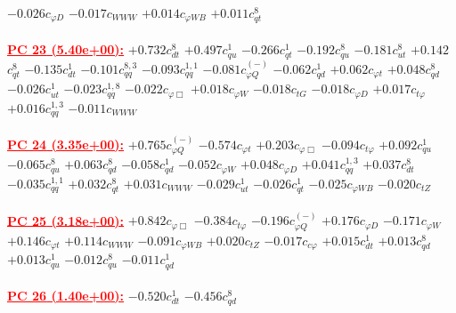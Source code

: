 \documentclass{article}
\begin{document}
{$-0.026$}{\rm $c_{\varphi D}$} 
{$-0.017$}{\rm $c_{WWW}$} 
{$+0.014$}{\rm $c_{\varphi WB}$} 
{$+0.011$}{\rm $c_{qt}^{8}$} 
 \nonumber \\ \nonumber \\ 
\noindent \textcolor{red}{\underline{\bf{PC 23} (5.40e+00):}}
{$+0.732$}{\rm $c_{dt}^{8}$} 
{$+0.497$}{\rm $c_{qu}^{1}$} 
{$-0.266$}{\rm $c_{qt}^{1}$} 
{$-0.192$}{\rm $c_{qu}^{8}$} 
{$-0.181$}{\rm $c_{ut}^{8}$} 
{$+0.142$}{\rm $c_{qt}^{8}$} 
{$-0.135$}{\rm $c_{dt}^{1}$} 
{$-0.101$}{\rm $c_{qq}^{8,3}$} 
{$-0.093$}{\rm $c_{qq}^{1,1}$} 
{$-0.081$}{\rm $c_{\varphi Q}^{(-)}$} 
{$-0.062$}{\rm $c_{qd}^{1}$} 
{$+0.062$}{\rm $c_{\varphi t}$} 
{$+0.048$}{\rm $c_{qd}^{8}$} 
{$-0.026$}{\rm $c_{ut}^{1}$} 
{$-0.023$}{\rm $c_{qq}^{1,8}$} 
{$-0.022$}{\rm $c_{\varphi \Box}$} 
{$+0.018$}{\rm $c_{\varphi W}$} 
{$-0.018$}{\rm $c_{tG}$} 
{$-0.018$}{\rm $c_{\varphi D}$} 
{$+0.017$}{\rm $c_{t \varphi}$} 
{$+0.016$}{\rm $c_{qq}^{1,3}$} 
{$-0.011$}{\rm $c_{WWW}$} 
 \nonumber \\ \nonumber \\ 
\noindent \textcolor{red}{\underline{\bf{PC 24} (3.35e+00):}}
{$+0.765$}{\rm $c_{\varphi Q}^{(-)}$} 
{$-0.574$}{\rm $c_{\varphi t}$} 
{$+0.203$}{\rm $c_{\varphi \Box}$} 
{$-0.094$}{\rm $c_{t \varphi}$} 
{$+0.092$}{\rm $c_{qu}^{1}$} 
{$-0.065$}{\rm $c_{qu}^{8}$} 
{$+0.063$}{\rm $c_{qd}^{8}$} 
{$-0.058$}{\rm $c_{qd}^{1}$} 
{$-0.052$}{\rm $c_{\varphi W}$} 
{$+0.048$}{\rm $c_{\varphi D}$} 
{$+0.041$}{\rm $c_{qq}^{1,3}$} 
{$+0.037$}{\rm $c_{dt}^{8}$} 
{$-0.035$}{\rm $c_{qq}^{1,1}$} 
{$+0.032$}{\rm $c_{qt}^{8}$} 
{$+0.031$}{\rm $c_{WWW}$} 
{$-0.029$}{\rm $c_{ut}^{1}$} 
{$-0.026$}{\rm $c_{qt}^{1}$} 
{$-0.025$}{\rm $c_{\varphi WB}$} 
{$-0.020$}{\rm $c_{tZ}$} 
 \nonumber \\ \nonumber \\ 
\noindent \textcolor{red}{\underline{\bf{PC 25} (3.18e+00):}}
{$+0.842$}{\rm $c_{\varphi \Box}$} 
{$-0.384$}{\rm $c_{t \varphi}$} 
{$-0.196$}{\rm $c_{\varphi Q}^{(-)}$} 
{$+0.176$}{\rm $c_{\varphi D}$} 
{$-0.171$}{\rm $c_{\varphi W}$} 
{$+0.146$}{\rm $c_{\varphi t}$} 
{$+0.114$}{\rm $c_{WWW}$} 
{$-0.091$}{\rm $c_{\varphi WB}$} 
{$+0.020$}{\rm $c_{tZ}$} 
{$-0.017$}{\rm $c_{c \varphi}$} 
{$+0.015$}{\rm $c_{dt}^{1}$} 
{$+0.013$}{\rm $c_{qd}^{8}$} 
{$+0.013$}{\rm $c_{qu}^{1}$} 
{$-0.012$}{\rm $c_{qu}^{8}$} 
{$-0.011$}{\rm $c_{qd}^{1}$} 
 \nonumber \\ \nonumber \\ 
\noindent \textcolor{red}{\underline{\bf{PC 26} (1.40e+00):}}
{$-0.520$}{\rm $c_{dt}^{1}$} 
{$-0.456$}{\rm $c_{qd}^{8}$} 
\end{document}
